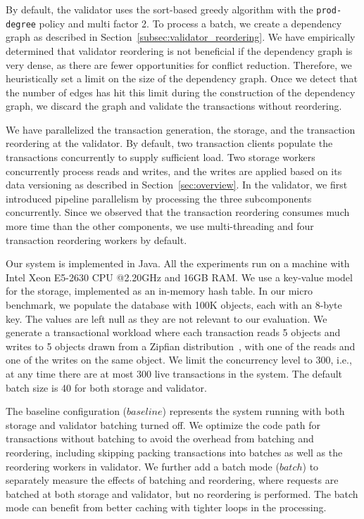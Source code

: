 By default, the validator uses the sort-based greedy algorithm with the \texttt{prod-degree} policy and multi factor 2. To process a batch, we create a dependency graph as described in Section~\ref{subsec:validator_reordering}. We have empirically determined that validator reordering is not beneficial if the dependency graph is very dense, as there are fewer opportunities for conflict reduction. Therefore, we heuristically set a limit on the size of the dependency graph. Once we detect that the number of edges has hit this limit during the construction of the dependency graph, we discard the graph and validate the transactions without reordering. 

We have parallelized the transaction generation, the storage, and the transaction reordering at the validator. By default, two transaction clients populate the transactions concurrently to supply sufficient load. Two storage workers concurrently process reads and writes, 
and the writes are applied based on its data versioning as described in Section~\ref{sec:overview}. 
In the validator, we first introduced pipeline parallelism by processing the three subcomponents concurrently. Since we observed that the transaction reordering consumes much more time than the other components, we use multi-threading and four transaction reordering workers by default.

Our system is implemented in Java. All the experiments run on a machine with
Intel Xeon E5-2630 CPU @2.20GHz and 16GB RAM. We use a key-value model for the
storage, implemented as an in-memory hash table. In our micro benchmark, we populate the database with 100K objects, each with an 8-byte key. The values are left null as they are not relevant to our evaluation. We generate a transactional workload where each transaction reads 5 objects and writes to 5 objects drawn from a Zipfian distribution~\cite{gray1994quickly}, with one of the reads and one of the writes on the same object. We limit the concurrency level to 300, i.e., at any time there are at most 300 live transactions in the system. The default batch size is 40 for both storage and validator.

The baseline configuration ($baseline$) represents the system running with both storage and validator batching turned off. We optimize the code path for transactions without batching to avoid the overhead from batching and reordering, including skipping packing transactions into batches as well as the reordering workers in validator. We further add a batch mode ($batch$) to separately measure the effects of batching and reordering, where requests are batched at both storage and validator, but no reordering is performed. The batch mode can benefit from better caching with tighter loops in the processing. 


